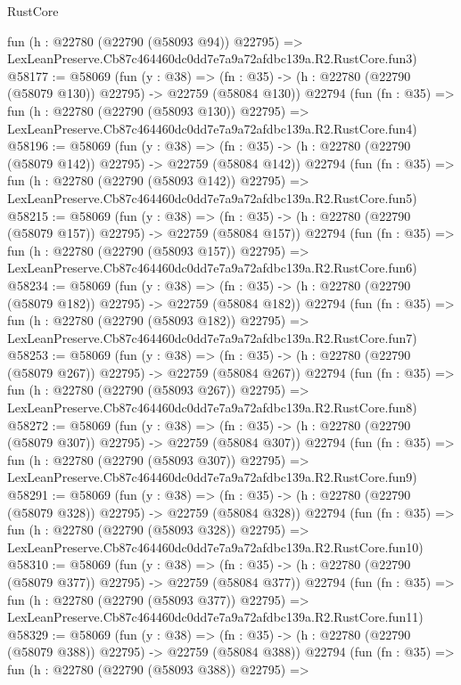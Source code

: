 \begin{lexlean}{RustCore}
\begin{coremodule}
    fun (h : @22780 (@22790 (@58093 @94)) @22795) =>
    LexLeanPreserve.Cb87c464460dc0dd7e7a9a72afdbc139a.R2.RustCore.fun3)
@58177 := @58069
    (fun (y : @38) =>
    (fn : @35) -> (h : @22780 (@22790 (@58079 @130)) @22795) -> @22759 (@58084 @130))
    @22794
    (fun (fn : @35) =>
    fun (h : @22780 (@22790 (@58093 @130)) @22795) =>
    LexLeanPreserve.Cb87c464460dc0dd7e7a9a72afdbc139a.R2.RustCore.fun4)
@58196 := @58069
    (fun (y : @38) =>
    (fn : @35) -> (h : @22780 (@22790 (@58079 @142)) @22795) -> @22759 (@58084 @142))
    @22794
    (fun (fn : @35) =>
    fun (h : @22780 (@22790 (@58093 @142)) @22795) =>
    LexLeanPreserve.Cb87c464460dc0dd7e7a9a72afdbc139a.R2.RustCore.fun5)
@58215 := @58069
    (fun (y : @38) =>
    (fn : @35) -> (h : @22780 (@22790 (@58079 @157)) @22795) -> @22759 (@58084 @157))
    @22794
    (fun (fn : @35) =>
    fun (h : @22780 (@22790 (@58093 @157)) @22795) =>
    LexLeanPreserve.Cb87c464460dc0dd7e7a9a72afdbc139a.R2.RustCore.fun6)
@58234 := @58069
    (fun (y : @38) =>
    (fn : @35) -> (h : @22780 (@22790 (@58079 @182)) @22795) -> @22759 (@58084 @182))
    @22794
    (fun (fn : @35) =>
    fun (h : @22780 (@22790 (@58093 @182)) @22795) =>
    LexLeanPreserve.Cb87c464460dc0dd7e7a9a72afdbc139a.R2.RustCore.fun7)
@58253 := @58069
    (fun (y : @38) =>
    (fn : @35) -> (h : @22780 (@22790 (@58079 @267)) @22795) -> @22759 (@58084 @267))
    @22794
    (fun (fn : @35) =>
    fun (h : @22780 (@22790 (@58093 @267)) @22795) =>
    LexLeanPreserve.Cb87c464460dc0dd7e7a9a72afdbc139a.R2.RustCore.fun8)
@58272 := @58069
    (fun (y : @38) =>
    (fn : @35) -> (h : @22780 (@22790 (@58079 @307)) @22795) -> @22759 (@58084 @307))
    @22794
    (fun (fn : @35) =>
    fun (h : @22780 (@22790 (@58093 @307)) @22795) =>
    LexLeanPreserve.Cb87c464460dc0dd7e7a9a72afdbc139a.R2.RustCore.fun9)
@58291 := @58069
    (fun (y : @38) =>
    (fn : @35) -> (h : @22780 (@22790 (@58079 @328)) @22795) -> @22759 (@58084 @328))
    @22794
    (fun (fn : @35) =>
    fun (h : @22780 (@22790 (@58093 @328)) @22795) =>
    LexLeanPreserve.Cb87c464460dc0dd7e7a9a72afdbc139a.R2.RustCore.fun10)
@58310 := @58069
    (fun (y : @38) =>
    (fn : @35) -> (h : @22780 (@22790 (@58079 @377)) @22795) -> @22759 (@58084 @377))
    @22794
    (fun (fn : @35) =>
    fun (h : @22780 (@22790 (@58093 @377)) @22795) =>
    LexLeanPreserve.Cb87c464460dc0dd7e7a9a72afdbc139a.R2.RustCore.fun11)
@58329 := @58069
    (fun (y : @38) =>
    (fn : @35) -> (h : @22780 (@22790 (@58079 @388)) @22795) -> @22759 (@58084 @388))
    @22794
    (fun (fn : @35) =>
    fun (h : @22780 (@22790 (@58093 @388)) @22795) =>

\end{coremodule}
\end{lexlean}
